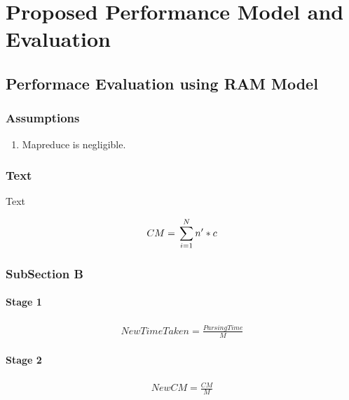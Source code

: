 \chapter{Proposed Performance Model and Evaluation}

\section{Performace Evaluation using RAM Model}
\subsection{Assumptions}
\begin{enumerate}
 \item Mapreduce\cite{mapreduce} is negligible.
\end{enumerate}
\subsection{Text}
Text

\begin{eqnarray}
CM = \newline\sum\limits_{i = 1}^N n' * c
\end{eqnarray}

\subsection{SubSection B}

\subsubsection{Stage 1 }

\begin{eqnarray}
 NewTimeTaken = \frac{ParsingTime}{M}
\end{eqnarray}
\subsubsection{Stage 2}

\begin{eqnarray}
NewCM = \frac{CM}{M}
\end{eqnarray}

